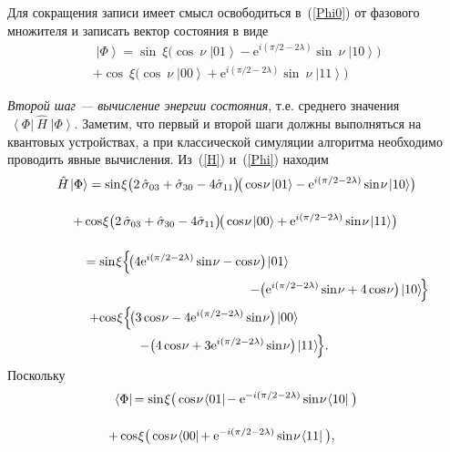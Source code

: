 \documentclass[a4paper]{report}
\newcommand{\ket}[1] {\!\!\;\ensuremath{\left|#1\right\rangle}}
\newcommand{\bra}[1] {\!\!\:\ensuremath{\left\langle#1\right|\!\!\:}}
\begin{document}
Для сокращения записи имеет смысл освободиться в~(\ref{Phi0}) от фазового множителя и записать вектор состояния в виде
\begin{multline}\label{Phi}
\ket\Phi= \sin\:\!\!\xi \big(\cos\:\!\!\nu\ket{01}- \mathrm{e}^{i(\pi/2-2\lambda)}\sin\:\!\!\nu\ket{10}\!\big)
\\
+\cos\:\!\!\xi \big(\cos\:\!\!\nu\ket{00}+ \mathrm{e}^{i(\pi/2-2\lambda)}\sin\:\!\!\nu\ket{11}\!\big)
\end{multline}

\textit{Второй шаг --- вычисление энергии состояния}, т.е. среднего значения $\bra\Phi{\hat{H}}\ket\Phi$. Заметим, что первый и второй шаги должны выполняться на квантовых устройствах, а при классической симуляции алгоритма необходимо проводить явные вычисления. Из~(\ref{H}) и~(\ref{Phi}) находим
\begin{multline}\label{}
{\hat{H}}\ket\Phi= \sin\:\!\!\xi\big(2\,\hat{\sigma}_{03}+ \hat{\sigma}_{30}- 4\hat{\sigma}_{11}\big)\! \big(\cos\:\!\!\nu\ket{01}- \mathrm{e}^{i(\pi/2-2\lambda)}\sin\:\!\!\nu\ket{10}\!\big)
\\
+\cos\:\!\!\xi\big(2\,\hat{\sigma}_{03}+ \hat{\sigma}_{30}- 4\hat{\sigma}_{11}\big)\! \big(\cos\:\!\!\nu\ket{00}+ \mathrm{e}^{i(\pi/2-2\lambda)}\sin\:\!\!\nu\ket{11}\!\big)
\hspace{0.2em} \vphantom{\int\limits^A_A}
\\%
={\sin\:\!\!\xi}\!\left\{\! \big(4\mathrm{e}^{i(\pi/2-2\lambda)}\sin\:\!\!\nu- \cos\:\!\!\nu\big)\ket{01}\right.\hspace{7.6em}
\\
\hspace{16em}\left.-\big(\mathrm{e}^{i(\pi/2-2\lambda)}\sin\:\!\!\nu+ 4\cos\:\!\!\nu\big)\ket{10}\!\right\}
\\%
+{\cos\:\!\!\xi}\!\left\{\! \big(3\cos\:\!\!\nu-4\mathrm{e}^{i(\pi/2-2\lambda)}\sin\:\!\!\nu\big)\ket{00} \right.\hspace{6.6em}
\\
\left.-\big(4\cos\:\!\!\nu+ 3\mathrm{e}^{i(\pi/2-2\lambda)}\sin\:\!\!\nu\big) \ket{11}\!\right\}\!.\hspace{0.5em}
\nonumber
\end{multline}
Поскольку
\begin{multline}\label{}
\bra\Phi=
\sin\:\!\!\xi \big(\cos\:\!\!\nu\bra{01}- \mathrm{e}^{-i(\pi/2-2\lambda)}\sin\:\!\!\nu\bra{10}\,\big)
\\
+\cos\:\!\!\xi \big(\cos\:\!\!\nu\bra{00}+ \mathrm{e}^{-i(\pi/2-2\lambda)}\sin\:\!\!\nu\bra{11}\,\big),
\hspace{2.2em} \vphantom{\int\limits^A}
\nonumber
\end{multline}
\end{document}
